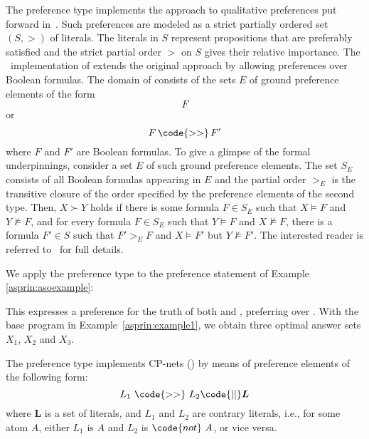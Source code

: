 The preference type  implements the approach to qualitative preferences put forward in~\cite{giumar12a}.
Such preferences are modeled as a strict partially ordered set
\(
(S,>)
\)
of literals.
The literals in $S$ represent propositions that are preferably satisfied
and the strict partial order $>$ on $S$ gives their relative importance.
%
The \asprin\ implementation of  extends the original approach by allowing preferences over Boolean formulas.
The domain of  consists of the sets $E$ of ground preference elements of the form
\[F\]
or 
\[F \, \code{>>} \, F'\]
where $F$ and $F'$ are Boolean formulas.
%
To give a glimpse of the formal underpinnings,
consider a set $E$ of such ground preference elements.
The set $S_E$ consists of all Boolean formulas appearing in $E$
and the partial order $>_E$ is the transitive closure of the order 
specified by the preference elements of the second type. 
Then, $X \succ Y$ holds if 
there is some formula $F \in S_E$ such that $X \models F$ and $Y \not\models F$, 
and for every formula $F \in S_E$ such that $Y \models F$ and $X \not\models F$, 
there is a formula
$F'\in S$ such that $F'>_{E}F$ and $X \models F'$ but $Y \not\models F'$.  The interested reader is referred to~\cite{giumar12a} for full details.  %
\begin{example}
%
%
We apply the preference type  to the preference statement of Example \ref{asprin:asoexample}:
%

%
This expresses a preference for the truth of both  and , 
preferring \code{a/1} over \code{b/1}.
With the base program in Example~\ref{asprin:example1}, 
we obtain three optimal answer sets $X_1$, $X_2$ and $X_3$.  
\end{example} %

\label{asprin:cp}
The preference type  implements CP-nets (\cite{bobrdohopo04a}) by means of 
preference elements of the following form:
\[ L_1 \ \code{>>} \ L_2 \code{ || } \boldsymbol{L}\]
where $\boldsymbol{L}$ is a set of literals,
and $L_1$ and $L_2$ are contrary literals,
i.e., for some atom $A$, either $L_1$ is $A$ and $L_2$ is $\code{not}~A$, or vice versa.

